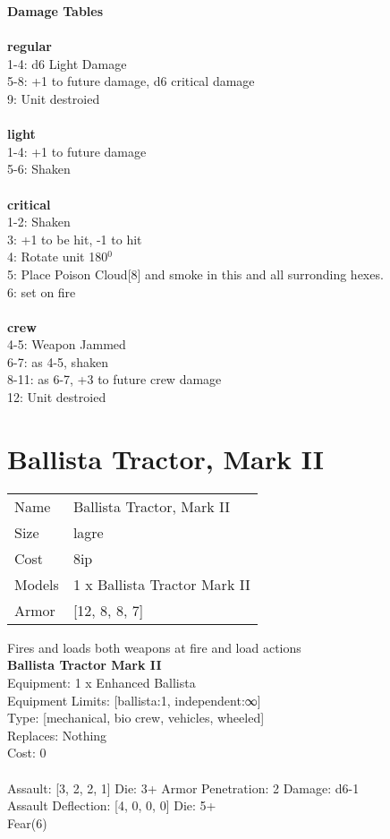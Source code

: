 {\bf Damage Tables} \\
\ \\ {\bf regular } \\
1-4: d6 Light Damage \\
5-8: +1 to future damage, d6 critical damage \\
9: Unit destroied \\
\ \\ {\bf light } \\
1-4: +1 to future damage \\
5-6: Shaken \\
\ \\ {\bf critical } \\
1-2: Shaken \\
3: +1 to be hit, -1 to hit \\
4: Rotate unit 180$^0$ \\
5: Place Poison Cloud[8] and smoke in this and all surronding hexes. \\
6: set on fire \\
\ \\ {\bf crew } \\
4-5: Weapon Jammed \\
6-7: as 4-5, shaken \\
8-11: as 6-7, +3 to future crew damage \\
12: Unit destroied \\










\pagebreak\pagebreak

\section{ Ballista Tractor, Mark II }

\begin{tabular}{ll}
  Name & Ballista Tractor, Mark II \\
  Size & lagre\\
  Cost & 8ip\\
  Models & 1 x Ballista Tractor Mark II\\
  Armor & [12, 8, 8, 7]\\
\end{tabular}

\noindent Fires and loads both weapons at fire and load actions\\ 


{\bf Ballista Tractor Mark II } \\
Equipment: 1 x Enhanced Ballista \\
Equipment Limits: [ballista:1, independent:∞] \\
Type: [mechanical, bio crew, vehicles, wheeled] \\
Replaces: Nothing \\
Cost: 0\\
\ \\
Assault: [3, 2, 2, 1] Die: 3+ Armor Penetration: 2 Damage: d6-1 \\
Assault Deflection: [4, 0, 0, 0] Die: 5+\\
\indent Fear(6)\\ 
 
